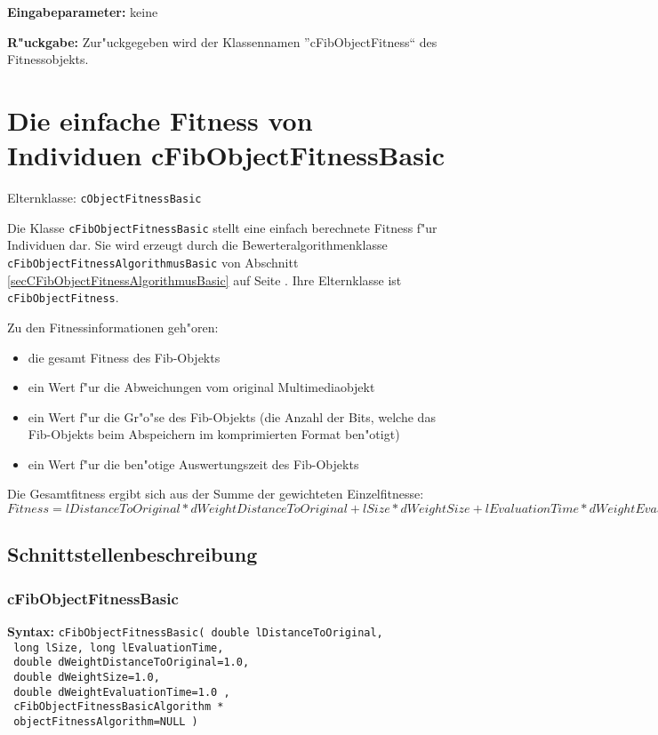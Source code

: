 \bigskip\noindent
\textbf{Eingabeparameter:} keine

\bigskip\noindent
\textbf{R"uckgabe:} Zur"uckgegeben wird der Klassennamen ''cFibObjectFitness`` des Fitnessobjekts.



\section{Die einfache Fitness von Individuen cFibObjectFitnessBasic}
\label{secCFibObjectFitnessBasic}

Elternklasse: \verb|cObjectFitnessBasic|

\bigskip\noindent
Die Klasse \verb|cFibObjectFitnessBasic| stellt eine einfach berechnete Fitness f"ur Individuen dar. Sie wird erzeugt durch die Bewerteralgorithmenklasse \verb|cFibObject|\verb|Fitness|\verb|Algorithmus|\verb|Basic| von Abschnitt \ref{secCFibObjectFitnessAlgorithmusBasic} auf Seite \pageref{secCFibObjectFitnessAlgorithmusBasic}. Ihre Elternklasse ist \verb|cFibObjectFitness|.

\bigskip\noindent
Zu den Fitnessinformationen geh"oren:
\begin{itemize}
 \item die gesamt Fitness des Fib-Objekts
 \item ein Wert f"ur die Abweichungen vom original Multimediaobjekt
 \item ein Wert f"ur die Gr"o"se des Fib-Objekts (die Anzahl der Bits, welche das Fib-Objekts beim Abspeichern im komprimierten Format ben"otigt)
 \item ein Wert f"ur die ben"otige Auswertungszeit des Fib-Objekts
\end{itemize}

Die Gesamtfitness ergibt sich aus der Summe der gewichteten Einzelfitnesse: $Fitness=lDistanceToOriginal*dWeightDistanceToOriginal+lSize*dWeightSize+lEvaluationTime*dWeightEvaluationTime$


\subsection{Schnittstellenbeschreibung}


\subsubsection{cFibObjectFitnessBasic}

\textbf{Syntax:} \verb|cFibObjectFitnessBasic( double lDistanceToOriginal, | \\\verb| long lSize, long lEvaluationTime, | \\\verb| double dWeightDistanceToOriginal=1.0, | \\\verb| double dWeightSize=1.0, | \\\verb| double dWeightEvaluationTime=1.0 , | \\\verb| cFibObjectFitnessBasicAlgorithm * | \\\verb| objectFitnessAlgorithm=NULL )| \\

